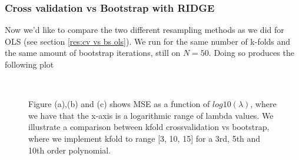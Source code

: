 \documentclass[../main.tex]{subfiles}
\begin{document}
\begin{flushleft}
\newpage
\subsubsection{Cross validation vs Bootstrap with RIDGE}\label{res:cv bs ridge}
Now we'd like to compare the two different resampling methods as we did  for OLS (see section \eqref{res:cv vs bs ols}). We run for the same number of k-folds and the same amount of bootstrap iterations, still on $N=50$. Doing so produces the following plot
\begin{figure}[H]
\hspace*{-0.6in}
\\
\hspace*{0.9in}

\caption{ Figure (a),(b) and (c) shows MSE as a function of $log10(\lambda)$, where we have that the x-axis is a logarithmic range of lambda values. We illustrate a comparison between kfold crossvalidation vs bootstrap, where we implement kfold to range [3, 10, 15] for a 3rd, 5th and 10th order polynomial.}
\label{fig: CV_Bootstrap_RIDGE}
\end{figure}
\end{flushleft}
\end{document}
